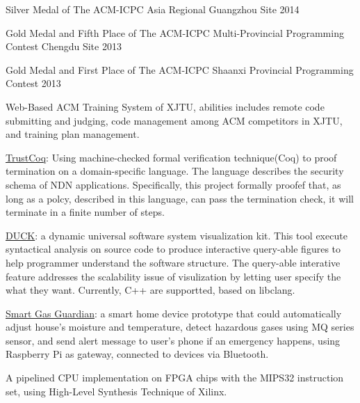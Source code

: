 \documentclass[]{deedy-resume-openfont}
\begin{document}
\begin{tightemize}
\item Silver Medal of The ACM-ICPC Asia Regional Guangzhou Site 2014
\item Gold Medal and Fifth Place of The ACM-ICPC Multi-Provincial Programming Contest Chengdu Site 2013
\item Gold Medal and First Place of The ACM-ICPC Shaanxi Provincial Programming Contest 2013
\item Web-Based ACM Training System of XJTU, abilities includes remote code submitting and judging, code management among ACM competitors in XJTU, and training plan management.
\end{tightemize}
\sectionsep

\begin{tightemize}
\item \href{https://github.com/Stumble/TrustCoq}{TrustCoq}: Using machine-checked formal verification technique(Coq) to proof termination on a domain-specific language. The language describes the security schema of NDN applications. Specifically, this project formally proofef that, as long as a polcy, described in this language, can pass the termination check, it will terminate in a finite number of steps.
\item \href{https://github.com/Stumble/duck}{DUCK}: a dynamic universal software system visualization kit. This tool execute syntactical analysis on source code to produce interactive query-able figures to help programmer understand the software structure. The query-able interative feature addresses the scalability issue of visulization by letting user specify the what they want. Currently, C++ are supportted, based on libclang.
\item \href{https://github.com/Stumble/smartGG}{Smart Gas Guardian}: a smart home device prototype that could automatically adjust house’s moisture and temperature, detect hazardous gases using MQ series sensor, and send alert message to user’s phone if an emergency happens, using Raspberry Pi as gateway, connected to devices via Bluetooth.
\item A pipelined CPU implementation on FPGA chips with the MIPS32 instruction set, using High-Level Synthesis Technique of Xilinx.
\end{tightemize}
\end{document}
